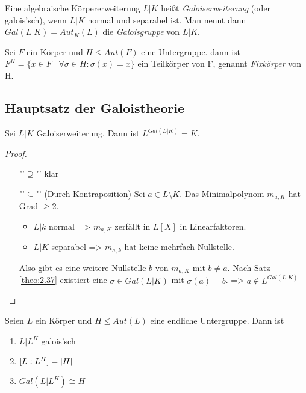 \documentclass[../main.tex]{subfiles}
\begin{document}
\begin{definition}
    Eine algebraische Körpererweiterung $L|K$ heißt \emph{Galoiserweiterung} (oder galois'sch), wenn $L|K$ normal und separabel ist.
    Man nennt dann $Gal(L|K) = Aut_K(L)$ die \emph{Galoisgruppe} von $L|K$.

    Sei $F$ ein Körper und $H\leq Aut(F)$ eine Untergruppe.
    dann ist $F^H = \{x\in F\mid \forall\sigma\in H:\sigma(x) = x\}$ ein Teilkörper von F, genannt \emph{Fixkörper} von H.
\end{definition}
\subsection{Hauptsatz der Galoistheorie}
\begin{lemma}
    Sei $L|K$ Galoiserweiterung. Dann ist $L^{Gal(L|K)} = K$.
\end{lemma}
\begin{proof}$ $
    \begin{enumerate}
        \item["'$\supseteq$"'] klar
        \item["'$\subseteq$"'] (Durch Kontraposition) Sei $a\in L\setminus K$. Das Minimalpolynom $m_{a,K}$ hat Grad $\geq2$.
        \begin{itemize}
            \item $L|k$ normal => $m_{a,K}$ zerfällt in $L[X]$ in Linearfaktoren.
            \item $L|K$ separabel => $m_{a,k}$ hat keine mehrfach Nullstelle.
        \end{itemize}
    
        Also gibt es eine weitere Nullstelle $b$ von $m_{a,K}$ mit $b\neq a$.
        Nach Satz \cref{theo:2.37} existiert eine $\sigma \in Gal(L|K)$ mit $\sigma(a)=b$.
        => $a\notin L^{Gal(L|K)}$
    \end{enumerate}
\end{proof}
\begin{theorem}
    Seien $L$ ein Körper und $H\leq Aut(L)$ eine endliche Untergruppe.
    Dann ist
    \begin{enumerate}
        \item $L|L^H$ galois'sch
        \item $[L:L^H] = \left\vert H \right\vert$
        \item $Gal(L|L^H)\cong H$
    \end{enumerate}
\end{theorem}
\end{document}

